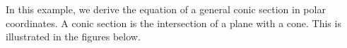 \begin{eg}\label{eg:conicA}
In this example, we derive the equation of a general conic section in 
polar coordinates. A conic section is the intersection of a plane with a cone.
This is illustrated in the figures below.
\end{eg}
